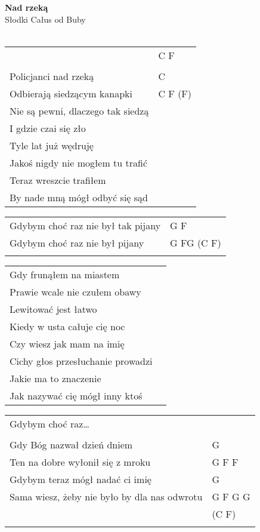 \documentclass[a5paper]{article}
\begin{document}


\noindent
\fontsize{12pt}{15pt}\selectfont
\textbf{Nad rzeką} \\
\fontsize{8pt}{10pt}\selectfont
Słodki Całus od Buby \\ \\
\fontsize{10pt}{12pt}\selectfont
{}
\begin{tabular}{@{}p{8.50cm}p{3cm}@{}}
\noindent
 & C F \\ \\
Policjanci nad rzeką & C \\
Odbierają siedzącym kanapki & C F (F) \\
Nie są pewni, dlaczego tak siedzą\\
I gdzie czai się zło\\
Tyle lat już wędruję\\
Jakoś nigdy nie mogłem tu trafić\\
Teraz wreszcie trafiłem\\
By nade mną mógł odbyć się sąd\\
\end{tabular}

\noindent
\begin{tabular}{@{}p{7.50cm}p{3cm}@{}}
Gdybym choć raz nie był tak pijany & G F\\
Gdybym choć raz nie był pijany & G FG (C F)\\ \\
\end{tabular}

\noindent
\begin{tabular}{@{}p{7.50cm}p{3cm}@{}}
Gdy frunąłem na miastem \\
Prawie wcale nie czułem obawy\\
Lewitować jest łatwo\\
Kiedy w usta całuje cię noc\\
Czy wiesz jak mam na imię\\
Cichy głos przesłuchanie prowadzi\\
Jakie ma to znaczenie\\
Jak nazywać cię mógł inny ktoś\\
\end{tabular}

\noindent
\begin{tabular}{@{}p{7.50cm}p{3cm}@{}}
Gdybym choć raz… \\ \\
Gdy Bóg nazwał dzień dniem & G \\
Ten na dobre wyłonił się z mroku & G F F \\
Gdybym teraz mógł nadać ci imię & G\\
Sama wiesz, żeby nie było by dla nas odwrotu & G F G G \\
& (C F) \\ \\
\end{tabular}
\end{document}
